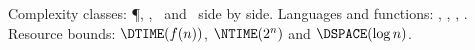 \documentclass{article}
\begin{document}
Complexity classes: \P, \NP, \BPP\ and \PSPACE\ side by side.
Languages and functions: , , , \poly.
Resource bounds: $\DTIME(f(n))$, $\NTIME(2^n)$ and $\DSPACE(\log n)$.
\end{document}
